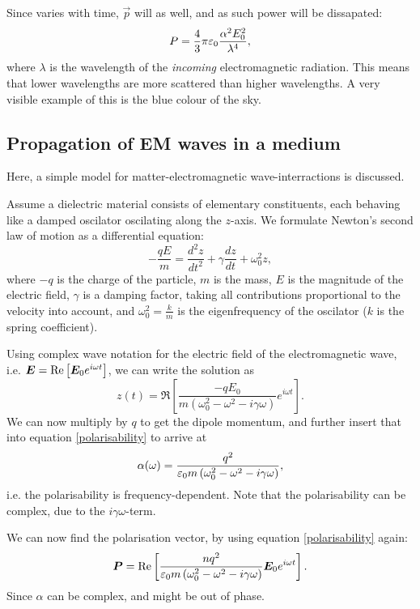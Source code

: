     Since \E{} varies with time, $\vec{p}$ will as well, and as such power will be dissapated: 
    \begin{equation}
        P = \frac{4}{3}\pi\varepsilon_0\frac{\alpha^2 E_0^2}{\lambda^4},
    \end{equation}
    where $\lambda$ is the wavelength of the \textit{incoming} electromagnetic radiation. 
    This means that lower wavelengths are more scattered than higher wavelengths. 
    A very visible example of this is the blue colour of the sky.

\subsection{Propagation of EM waves in a medium}
    Here, a simple model for matter-electromagnetic wave-interractions is discussed. 

    Assume a dielectric material consists of elementary constituents, 
    each behaving like a damped oscilator oscilating along the $z$-axis.
    We formulate Newton's second law of motion as a differential equation: 
    \begin{equation*}
        -\frac{qE}{m} = \frac{d^2z}{dt^2} + \gamma\frac{dz}{dt} + \omega_0^2z,
    \end{equation*}
    where $-q$ is the charge of the particle, $m$ is the mass, $E$ is the magnitude of the electric field, 
    $\gamma$ is a damping factor, taking all contributions proportional to the velocity into account, 
    and $\omega_0^2 = \frac{k}{m}$ is the eigenfrequency of the oscilator ($k$ is the spring coefficient).

    Using complex wave notation for the electric field of the electromagnetic wave, 
    i.e. $\bm{E} = \Re\left[\bm{E}_0 e^{i\omega t}\right]$, we can write the solution as 
    \begin{equation}
        z(t) = \Re\left[\frac{-qE_0}{m\left(\omega_0^2 - \omega^2-i\gamma\omega\right)}e^{i\omega t}\right].
    \end{equation}
    We can now multiply by $q$ to get the dipole momentum, and further insert that into equation \eqref{polarisability} to arrive at
    \begin{equation}
        \alpha(\omega) = \frac{q^2}{\varepsilon_0 m\left(\omega_0^2 - \omega^2 - i\gamma\omega\right)},
    \end{equation}
    i.e. the polarisability is frequency-dependent. Note that the polarisability can be complex, due to the $i\gamma\omega$-term.

    We can now find the polarisation vector, by using equation \eqref{polarisability} again: 
    \begin{equation}
        \bm{P} = \Re\left[\frac{nq^2}{\varepsilon_0 m\left(\omega_0^2 - \omega^2 - i\gamma\omega\right)}\bm{E}_0e^{i\omega t}\right].
    \end{equation}
    Since $\alpha$ can be complex, \p{} and \E{} might be out of phase.

